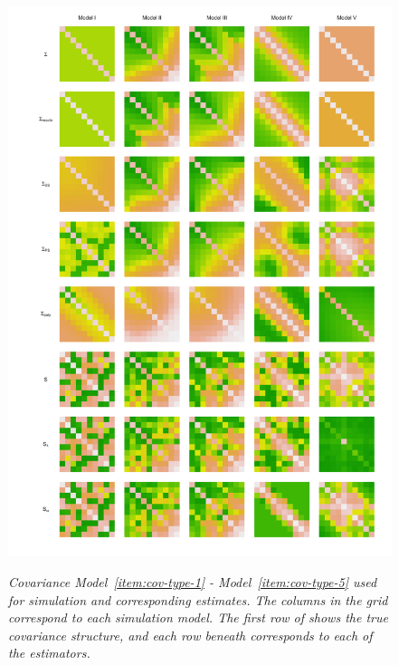 \begin{figure}[H] 
\centering
\caption{\textit{Covariance Model~\ref{item:cov-type-1} - Model~\ref{item:cov-type-5} used for simulation and corresponding estimates. The columns in the grid correspond to each simulation model. The first row of shows the true covariance structure, and each row beneath corresponds to each of the estimators.}}
  \includegraphics[width = 1\textwidth]{img/chapter-4/cov-estimate-lattice}\label{fig:cov-estimate-lattice}
\end{figure}

